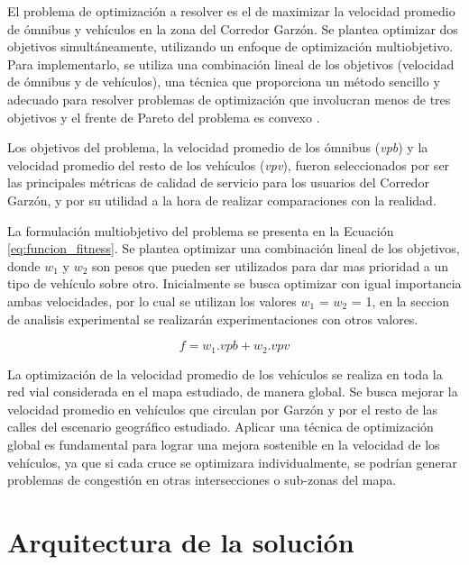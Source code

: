 El problema de optimización a resolver es el de maximizar la velocidad promedio de ómnibus y vehículos en la zona del Corredor Garzón. Se plantea optimizar dos objetivos simultáneamente, utilizando un enfoque de optimización multiobjetivo. Para implementarlo, se utiliza una combinación lineal de los objetivos (velocidad de ómnibus y de vehículos), una técnica que proporciona un método sencillo y adecuado para resolver problemas de optimización que involucran menos de tres objetivos y el frente de Pareto del problema es convexo \citep{coello2002evolutionary}.

Los objetivos del problema, la velocidad promedio de los ómnibus (\emph{vpb}) y la velocidad promedio del resto de los vehículos (\emph{vpv}), fueron seleccionados por ser las principales métricas de calidad de servicio para los usuarios del Corredor Garzón, y por su utilidad a la hora de realizar comparaciones con la realidad.

La formulación multiobjetivo del problema se presenta en la Ecuación \ref{eq:funcion_fitness}. Se plantea optimizar una combinación lineal de los objetivos, donde \emph{$w_1$} y \emph{$w_2$} son pesos que pueden ser utilizados para dar mas prioridad a un tipo de vehículo sobre otro. Inicialmente se busca optimizar con igual importancia ambas velocidades, por lo cual se utilizan los valores $w_1$ = $w_2$ = 1, en la seccion de analisis experimental se realizarán experimentaciones con otros valores.

\begin{equation}
\label{eq:funcion_fitness}
f = w_1.vpb + w_2.vpv
\end{equation}

La optimización de la velocidad promedio de los vehículos se realiza en toda la red vial considerada en el mapa estudiado, de manera global. Se busca mejorar la velocidad promedio en vehículos que circulan por Garzón y por el resto de las calles del escenario geográfico estudiado. Aplicar una técnica de optimización global es fundamental para lograr una mejora sostenible en la velocidad de los vehículos, ya que si cada cruce se optimizara individualmente, se podrían generar problemas de congestión en otras intersecciones o sub-zonas del mapa.

\section{Arquitectura de la solución}


